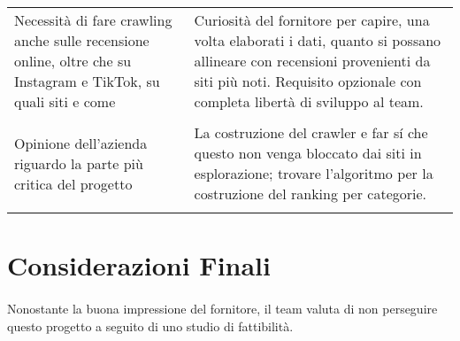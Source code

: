 \begin{longtable}{|p{7cm}|p{8cm}|}
    Necessità di fare crawling anche sulle recensione
    online, oltre che su Instagram e TikTok, su quali siti e come
    &
    Curiosità del fornitore per capire, una volta
    elaborati i dati, quanto si possano allineare con
    recensioni provenienti da siti più noti.
    Requisito opzionale con completa libertà di sviluppo al team.\\

    & \\
    
    Opinione dell'azienda riguardo la parte più critica del
    progetto
    &
    La costruzione del crawler e far sí che questo
    non venga bloccato dai siti in esplorazione;
    trovare l’algoritmo per la costruzione del
    ranking per categorie.\\
    
    & \\
    
    \hline
\end{longtable}

\section{Considerazioni Finali}

\paragraph{}
Nonostante la buona impressione del fornitore, il team valuta di non perseguire
questo progetto a seguito di uno studio di fattibilità.